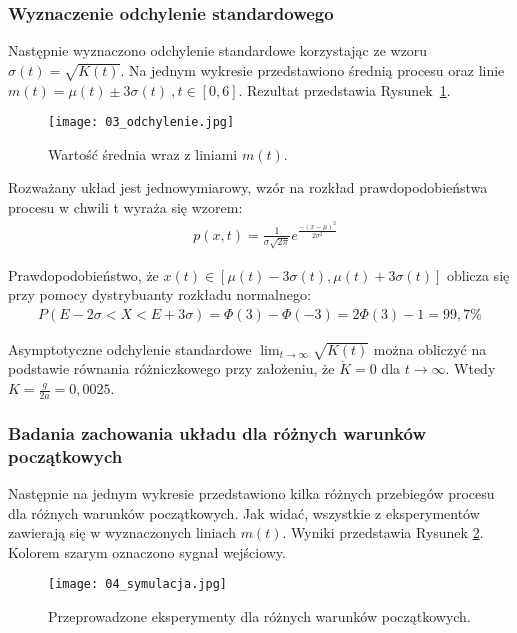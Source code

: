 \documentclass[a4paper,15pt]{article}
\begin{document}
\subsubsection{Wyznaczenie odchylenie standardowego}
Następnie wyznaczono odchylenie standardowe korzystając ze wzoru \( \sigma (t) = \sqrt{K(t)} \). Na jednym wykresie przedstawiono średnią procesu oraz linie \( m(t) = \mu (t) \pm 3\sigma (t) \ , t \in [0,6] \). Rezultat przedstawia \mbox{Rysunek \ref{fig:03_odchylenie}}.
\begin{figure}[H]
\centerline{\texttt{[image: 03\_odchylenie.jpg]}}
\centering
\caption{Wartość średnia wraz z liniami \( m(t) \).}
\label{fig:03_odchylenie}
\end{figure}
Rozważany układ jest jednowymiarowy, wzór na rozkład prawdopodobieństwa procesu w chwili t wyraża się wzorem:
\begin{align*}
& p(x,t) = \frac{1}{\sigma\sqrt{2\pi}}e^{\frac{-(x-\mu)^2}{2\sigma ^2}}
\end{align*}

Prawdopodobieństwo, że \( x(t) \in [\mu(t) - 3\sigma(t), \mu(t) + 3\sigma(t) ] \) oblicza się przy pomocy dystrybuanty rozkładu normalnego:
\begin{align*}
P(  E - 2 \sigma < X < E + 3\sigma ) = \Phi (3) - \Phi (-3) = 2\Phi (3) - 1 = 99,7\%
\end{align*}

Asymptotyczne odchylenie standardowe \( \lim _{ t \rightarrow \infty } \sqrt{K(t)} \) można obliczyć na podstawie równania różniczkowego przy założeniu, że \( \dot{K} = 0 \) dla \( t \rightarrow \infty \). Wtedy \( K = \frac{g}{2a} = 0,0025 \).

\subsubsection{Badania zachowania układu dla różnych warunków początkowych}
Następnie na jednym wykresie przedstawiono kilka różnych przebiegów procesu dla różnych warunków początkowych. Jak widać, wszystkie z eksperymentów zawierają się w wyznaczonych liniach \( m(t) \). Wyniki przedstawia Rysunek \ref{fig:04_symulacja}. 
Kolorem szarym oznaczono sygnał wejściowy.

\begin{figure}[H]
\centerline{\texttt{[image: 04\_symulacja.jpg]}}
\centering
\caption{Przeprowadzone eksperymenty dla różnych warunków początkowych.}
\label{fig:04_symulacja}
\end{figure}
\end{document}

